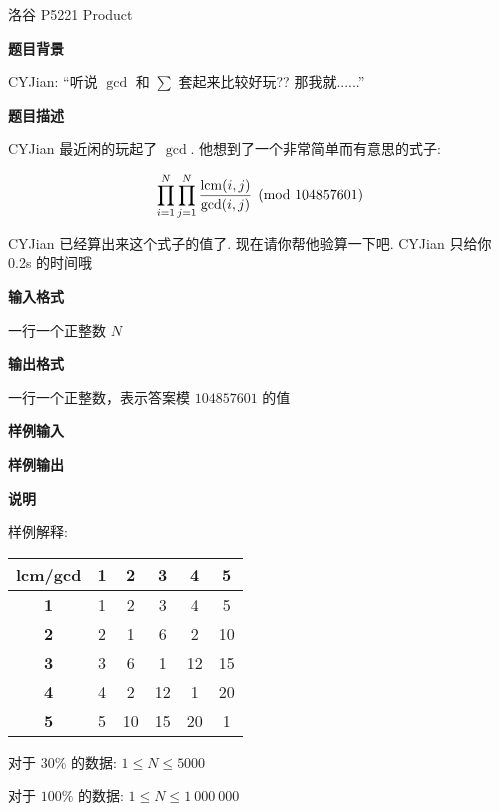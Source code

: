 \begin{frame}{洛谷 P5221 Product}
	\label{mulf:example:lgp5221}

	\textbf{题目背景}

	CYJian: ``听说 \(\gcd\) 和 \(\sum\) 套起来比较好玩?? 那我就......''

	\textbf{题目描述}

	CYJian 最近闲的玩起了 \(\gcd\). 他想到了一个非常简单而有意思的式子:

	\[
		\prod_{i=1}^N\prod_{j=1}^N\frac{\operatorname{lcm}(i,j)}{\gcd(i,j)}\pmod{104857601}
	\]

	CYJian 已经算出来这个式子的值了. 现在请你帮他验算一下吧. CYJian 只给你 0.2s 的时间哦

	\textbf{输入格式}

	一行一个正整数 \(N\)

	\textbf{输出格式}

	一行一个正整数，表示答案模 \(104857601\) 的值

	\textbf{样例输入}


	\textbf{样例输出}


	\textbf{说明}

	样例解释:

	\begin{tabular}{cccccc}
		\hline
		lcm/gcd    & 1 & 2  & 3  & 4  & 5  \\
		\hline
		\textbf{1} & 1 & 2  & 3  & 4  & 5  \\
		\textbf{2} & 2 & 1  & 6  & 2  & 10 \\
		\textbf{3} & 3 & 6  & 1  & 12 & 15 \\
		\textbf{4} & 4 & 2  & 12 & 1  & 20 \\
		\textbf{5} & 5 & 10 & 15 & 20 & 1  \\
		\hline
	\end{tabular}

	对于 \(30\%\) 的数据: \(1 \leq N \leq 5000\)

	对于 \(100\%\) 的数据: \(1 \leq N \leq 1\ 000\ 000\)
\end{frame}



